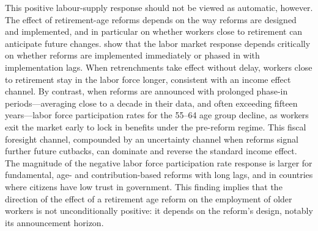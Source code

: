 \documentclass[11pt,english,a4paper, twoside, authoryear]{article}
\begin{document}

This positive labour-supply response should not be viewed as automatic, however. The effect of retirement-age reforms depends on the way reforms are designed and implemented, and in particular on whether workers close to retirement can anticipate future changes. \citet{BiZubairy2023} show that the labor market response depends critically on whether reforms are implemented immediately or phased in with implementation lags. When retrenchments take effect without delay, workers close to retirement stay in the labor force longer, consistent with an income effect channel. By contrast, when reforms are announced with prolonged phase-in periods---averaging close to a decade in their data, and often exceeding fifteen years---labor force participation rates for the 55--64 age group decline, as workers exit the market early to lock in benefits under the pre-reform regime. This fiscal foresight channel, compounded by an uncertainty channel when reforms signal further future cutbacks, can dominate and reverse the standard income effect. The magnitude of the negative labor force participation rate response is larger for fundamental, age- and contribution-based reforms with long lags, and in countries where citizens have low trust in government. This finding implies that the direction of the effect of a retirement age reform on the employment of older workers is not unconditionally positive: it depends on the reform's design, notably its announcement horizon.
\end{document}
